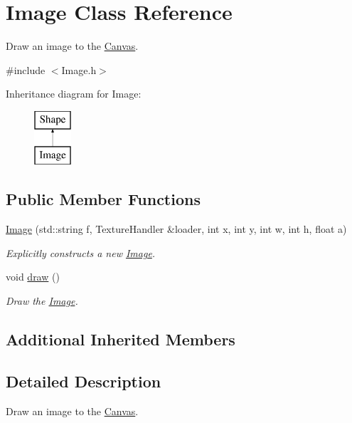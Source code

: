 \hypertarget{class_image}{\section{Image Class Reference}
\label{class_image}
}


Draw an image to the \hyperlink{class_canvas}{Canvas}.  




{\ttfamily \#include $<$Image.\+h$>$}

Inheritance diagram for Image\+:\begin{figure}[H]
\begin{center}
\leavevmode
\includegraphics[height=2.000000cm]{class_image}
\end{center}
\end{figure}
\subsection*{Public Member Functions}
\begin{DoxyCompactItemize}
\item 
\hyperlink{class_image_a58510b49ddb40c9bd5d1971d53193a47}{Image} (std\+::string f, Texture\+Handler \&loader, int x, int y, int w, int h, float a)
\begin{DoxyCompactList}\small\item\em Explicitly constructs a new \hyperlink{class_image}{Image}. \end{DoxyCompactList}\item 
void \hyperlink{class_image_ae1e16dcef3072e4e49ec2887a9c1245a}{draw} ()
\begin{DoxyCompactList}\small\item\em Draw the \hyperlink{class_image}{Image}. \end{DoxyCompactList}\end{DoxyCompactItemize}
\subsection*{Additional Inherited Members}


\subsection{Detailed Description}
Draw an image to the \hyperlink{class_canvas}{Canvas}. 

